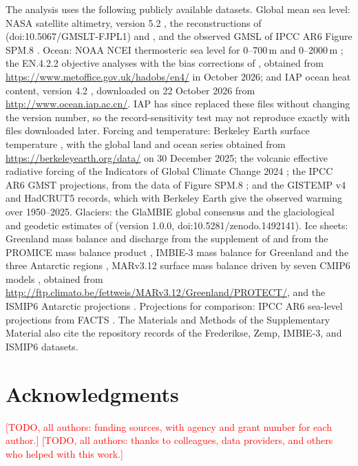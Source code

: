 \documentclass[draft,linenumbers]{agujournal2025}
\begin{document}
The analysis uses the following publicly available datasets.
Global mean sea level: NASA satellite altimetry, version 5.2 \citep{NASASSH2024,Beckley2017}, the reconstructions of \citet{Frederikse2020} (doi:10.5067/GMSLT-FJPL1) and \citet{Dangendorf2024data}, and the observed GMSL of IPCC AR6 Figure SPM.8 \citep{Fyfe2021data}.
Ocean: NOAA NCEI thermosteric sea level for 0--700\,m and 0--2000\,m \citep{Levitus2017data,Levitus2012}; the EN.4.2.2 objective analyses with the bias corrections of \citet{Gouretski2010} \citep{Good2013}, obtained from \url{https://www.metoffice.gov.uk/hadobs/en4/} in October 2026; and IAP ocean heat content, version 4.2 \citep{Cheng2024data}, downloaded on 22 October 2026 from \url{http://www.ocean.iap.ac.cn/}. IAP has since replaced these files without changing the version number, so the record-sensitivity test may not reproduce exactly with files downloaded later.
Forcing and temperature: Berkeley Earth surface temperature \citep{Rohde2020,Rohde2026data}, with the global land and ocean series obtained from \url{https://berkeleyearth.org/data/} on 30 December 2025; the volcanic effective radiative forcing of the Indicators of Global Climate Change 2024 \citep{Smith2025data,Forster2025}; the IPCC AR6 GMST projections, from the data of Figure SPM.8 \citep{Fyfe2021data,Lee2021}; and the GISTEMP v4 \citep{Lenssen2019} and HadCRUT5 \citep{Morice2021} records, which with Berkeley Earth give the observed warming over 1950--2025.
Glaciers: the GlaMBIE global consensus \citep{GlaMBIE2024data,GlaMBIE2025} and the glaciological and geodetic estimates of \citet{Zemp2019} (version 1.0.0, doi:10.5281/zenodo.1492141).
Ice sheets: Greenland mass balance and discharge from the supplement of \citet{Mouginot2019} and from the PROMICE mass balance product \citep{Larsen2021data,Mankoff2021}, IMBIE-3 mass balance for Greenland and the three Antarctic regions \citep[doi:10.5285/128c5e33-5224-4197-82f0-19dcc95b80a0;][]{Otosaka2026}, MARv3.12 surface mass balance driven by seven CMIP6 models \citep{Boberg2026}, obtained from \url{http://ftp.climato.be/fettweis/MARv3.12/Greenland/PROTECT/}, and the ISMIP6 Antarctic projections \citep[doi:10.5281/zenodo.3940766;][]{Seroussi2020}.
Projections for comparison: IPCC AR6 sea-level projections from FACTS \citep{Garner2023,Kopp2023}. The Materials and Methods of the Supplementary Material also cite the repository records of the Frederikse, Zemp, IMBIE-3, and ISMIP6 datasets.

\section*{Acknowledgments}
\textcolor{red}{[TODO, all authors: funding sources, with agency and grant number for each author.]}
\textcolor{red}{[TODO, all authors: thanks to colleagues, data providers, and others who helped with this work.]}
\end{document}
